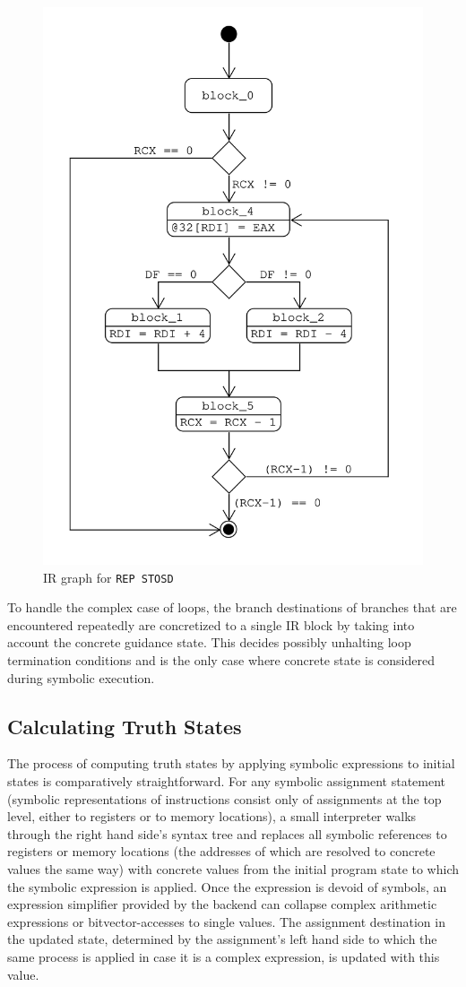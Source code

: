 \begin{figure}[htpb]
    \centering
    \includegraphics[width=0.7\linewidth]{figures/ir_graph_repstosd.png}
    \caption{IR graph for \texttt{REP STOSD}}\label{fig:ir_graph_repstod}
\end{figure}

To handle the complex case of loops, the branch destinations of branches that are encountered repeatedly are concretized
to a single IR block by taking into account the concrete guidance state. This decides possibly unhalting loop
termination conditions and is the only case where concrete state is considered during symbolic execution.

\subsection{Calculating Truth States}

The process of computing truth states by applying symbolic expressions to initial states is comparatively
straightforward. For any symbolic assignment statement (symbolic representations of instructions consist only of
assignments at the top level, either to registers or to memory locations), a small interpreter walks through the right
hand side's syntax tree and replaces all symbolic references to registers or memory locations (the addresses of which
are resolved to concrete values the same way) with concrete values from the initial program state to which the symbolic
expression is applied. Once the expression is devoid of symbols, an expression simplifier provided by the backend can
collapse complex arithmetic expressions or bitvector-accesses to single values. The assignment destination in the
updated state, determined by the assignment's left hand side to which the same process is applied in case it is a
complex expression, is updated with this value.

